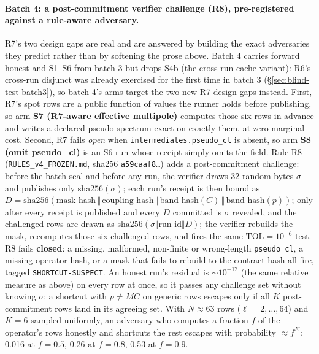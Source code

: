 \documentclass[11pt]{article}
\begin{document}
\paragraph{Batch 4: a post-commitment verifier challenge (R8), pre-registered against a rule-aware adversary.}
\label{sec:blind-test-batch4}
R7's two design gaps are real and are answered by building the exact
adversaries they predict rather than by softening the prose above. Batch 4
carries forward honest and S1--S6 from batch 3 but drops S4b (the
cross-run cache variant): R6's cross-run disjunct was already exercised for
the first time in batch 3 (\S\ref{sec:blind-test-batch3}), so batch 4's arms
target the two new R7 design gaps instead. First,
R7's spot rows are a public function of values the runner holds before
publishing, so arm \textbf{S7 (R7-aware effective multipole)} computes those
six rows in advance and writes a declared pseudo-spectrum exact on exactly
them, at zero marginal cost. Second, R7 fails \emph{open} when
\texttt{intermediates.pseudo\_cl} is absent, so arm \textbf{S8 (omit
pseudo\_cl)} is an S6 run whose receipt simply omits the field. Rule R8
(\texttt{RULES\_v4\_FROZEN.md}, sha256 \texttt{a59caaf8\ldots}) adds a
post-commitment challenge: before the batch seal and before any run, the
verifier draws 32 random bytes \(\sigma\) and publishes only
\(\mathrm{sha256}(\sigma)\); each run's receipt is then bound as
\(D=\mathrm{sha256}(\text{mask hash}\,\Vert\,\text{coupling hash}\,\Vert\,
\text{band\_hash}(C)\,\Vert\,\text{band\_hash}(p))\); only after every
receipt is published and every \(D\) committed is \(\sigma\) revealed, and
the challenged rows are drawn as \(\mathrm{sha256}(\sigma \Vert \text{run
id} \Vert D)\); the verifier rebuilds the mask, recomputes those six
challenged rows, and fires the same \(\mathrm{TOL}=10^{-6}\) test. R8 fails
\textbf{closed}: a missing, malformed, non-finite or wrong-length
\texttt{pseudo\_cl}, a missing operator hash, or a mask that fails to
rebuild to the contract hash all fire, tagged \texttt{SHORTCUT-SUSPECT}. An
honest run's residual is \(\sim10^{-12}\) (the same relative measure as
above) on every row at once, so it passes
any challenge set without knowing \(\sigma\); a shortcut with \(p\neq MC\)
on generic rows escapes only if all \(K\) post-commitment rows land in its
agreeing set. With \(N\approx63\) rows (\(\ell=2,\ldots,64\)) and
\(K=6\) sampled uniformly, an adversary who computes a fraction \(f\) of the
operator's rows honestly and shortcuts the rest escapes with probability
\(\approx f^K\): 0.016 at \(f=0.5\), 0.26 at \(f=0.8\), 0.53 at \(f=0.9\).
\end{document}
